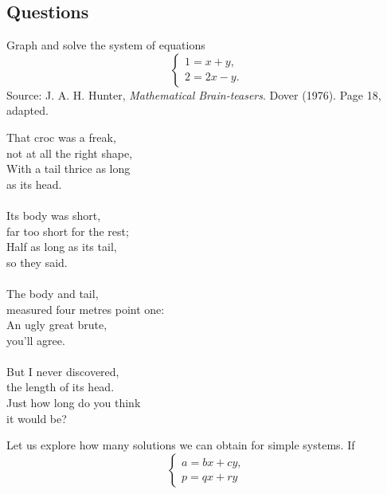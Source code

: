 \subsection*{Questions}
\begin{questions}
  \question Graph and solve the system of equations
            \begin{displaymath}
              \begin{cases}
                1 = x + y,\\
                2 = 2x - y.
              \end{cases}
            \end{displaymath}
  \question Source: J. A. H. Hunter, \emph{Mathematical Brain-teasers}. Dover (1976). Page 18, adapted.
    \begin{adjustwidth}{2em}{0em}
      That croc was a freak,\\\qquad not at all the right shape,\\
      With a tail thrice as long\\\qquad\qquad as its head.\\
      ~\\
      Its body was short,\\\qquad far too short for the rest;\\
      Half as long as its tail,\\\qquad\qquad so they said.\\
      ~\\
      The body and tail,\\\qquad measured four metres point one:\\
      An ugly great brute,\\\qquad\qquad you'll agree.\\
      ~\\
      But I never discovered,\\\qquad the length of its head.\\
      Just how long do you think\\\qquad\qquad it would be?
    \end{adjustwidth}
  \question Let us explore how many solutions we can obtain for simple systems. If
            \begin{displaymath}
              \begin{cases}
                a = bx + cy,\\
                p = qx + ry
              \end{cases}
            \end{displaymath}

\end{questions}

